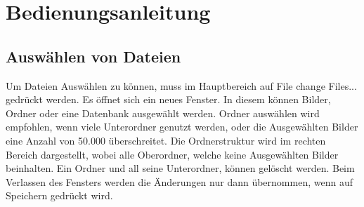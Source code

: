 \section*{Bedienungsanleitung}
\subsection*{Auswählen von Dateien}
Um Dateien Auswählen zu können, muss im Hauptbereich auf File \textrightarrow change Files... gedrückt werden. Es öffnet sich ein neues Fenster. In diesem können Bilder, Ordner oder eine Datenbank ausgewählt werden. Ordner auswählen wird empfohlen, wenn viele Unterordner genutzt werden, oder die Ausgewählten Bilder eine Anzahl von 50.000 überschreitet. Die Ordnerstruktur wird im rechten Bereich dargestellt, wobei alle Oberordner, welche keine Ausgewählten Bilder beinhalten. Ein Ordner und all seine Unterordner, können gelöscht werden. Beim Verlassen des Fensters werden die Änderungen nur dann übernommen, wenn auf Speichern  gedrückt wird.
\begin{figure}[h]
    \centering
    \label{Dateien Auswählen}
\end{figure}

